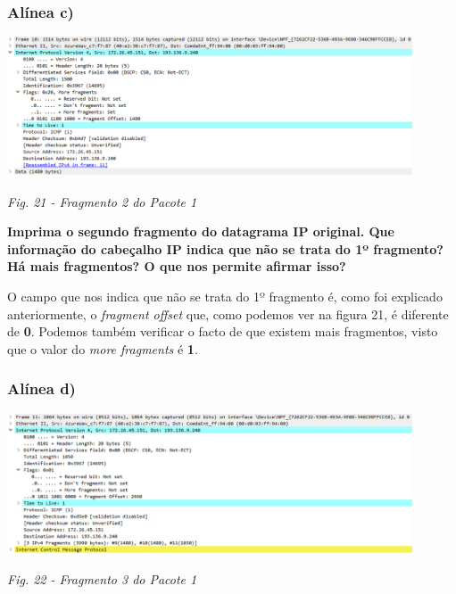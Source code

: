 \documentclass{article}
\begin{document}
\subsubsection{Alínea c)}
\begin{center}
\includegraphics[width=12cm]{1243.png}\par\caption{\textit{Fig. 21 - Fragmento 2 do Pacote 1}}\par\vspace{0.3cm}
\end{center}
\textbf{Imprima o segundo fragmento do datagrama IP original. Que informação do cabeçalho IP indica que não se trata do 1º fragmento? Há mais fragmentos? O que nos permite afirmar isso?}\par\vspace{0.35cm}
\hspace{0.5cm}O campo que nos indica que não se trata do 1º fragmento é, como foi explicado anteriormente, o \emph{fragment offset} que, como podemos ver na figura 21, é diferente de \textbf{0}. Podemos também verificar o facto de que existem mais fragmentos, visto que o valor do \emph{more fragments} é \textbf{1}.\vspace{0.35cm}

\subsubsection{Alínea d)}
\begin{center}
\includegraphics[width=12cm]{awfa.png}\par\caption{\textit{Fig. 22 - Fragmento 3 do Pacote 1}}\par\vspace{0.3cm}
\end{center}
\end{document}
